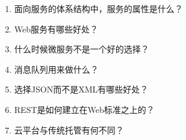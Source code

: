 \begin{enumerate}
\item
面向服务的体系结构中，服务的属性是什么？

\item
Web服务有哪些好处？

\item
什么时候微服务不是一个好的选择？

\item
消息队列用来做什么？

\item
选择JSON而不是XML有哪些好处？

\item
REST是如何建立在Web标准之上的？

\item
云平台与传统托管有何不同？
\end{enumerate}